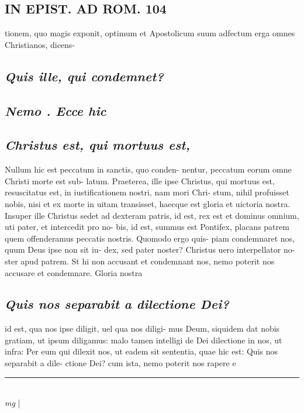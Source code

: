\documentclass{article}
\begin{document}
\begin{pages}
\section*{IN EPIST. AD ROM.  104 }
\marginpar{[ p.]}\pstart tionem, quo magis exponit, optimum et Apostolicum suum adfectum erga omnes Christianos, dicens-  \pend
{}
{}
\subsection*{\textit{Quis ille, qui condemnet? }}
{}
\subsection*{\textit{Nemo . Ecce hic }}
{}
\subsection*{\textit{Christus est, qui mortuus est, }}\pstart Nullum hic est peccatum in sanctis, quo conden- nentur, peccatum eorum omne Christi morte est sub- latum. Praeterea, ille ipse Christus, qui mortuus est, resuscitatus est, in iustificationem nostri, nam mori Chri- stum, nihil profuisset nobis, nisi et ex morte in uitam transisset, haecque est gloria et uictoria nostra. Insuper ille Christus sedet ad dexteram patris, id est, rex est et dominus omnium, uti pater, et intercedit pro no- bis, id est, summus est Pontifex, placans patrem quem offenderamus peccatis nostris. Quomodo ergo quis- piam condemnaret nos, quum Deus ipse non sit iu- dex, sed pater noster? Christus uero interpellator no- ster apud patrem. St hi non accusant et condemnant nos, nemo poterit nos accusare et condemnare.  Gloria nostra  \pend
{}
{}
\subsection*{\textit{Quis nos separabit a dilectione Dei? }}\pstart id est, qua nos ipse diligit, uel qua nos diligi- mus Deum, siquidem dat nobis gratiam, ut ipsum diligamus: malo tamen intelligi de Dei dilectione in nos, ut infra: Per eum qui dilexit nos, ut eadem sit sententia, quae hic est: Quis nos separabit a dile- ctione Dei? cum ista, nemo poterit nos rapere e  \pend
\vspace{0.5cm}\noindent
\vspace{0.2cm}\rule{1cm}{0.2pt}\\ 
\hspace{0.2cm}\textit{mg}
\footnotesize 
\normalsize| 

\end{pages}
\end{document}
